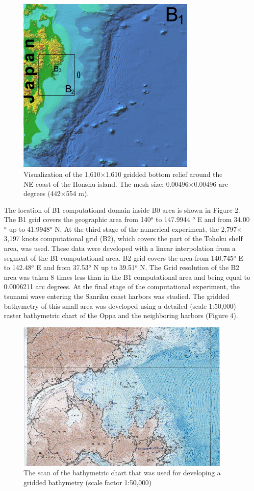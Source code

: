 \documentclass{aip-cp}
\begin{document}
\begin{figure}[h]
  \centerline{\includegraphics[width=250pt]{art/Fig_03_2.png}}
  \caption{Visualization of the 1,610$\times$1,610 gridded bottom relief around the 
NE coast of the Honshu island. The mesh size: 0.00496$\times$0.00496 arc degrees 
(442$\times$554 m).}
\end{figure}

The location of B1 computational domain inside B0 area is shown in Figure 2. 
The B1 grid covers the geographic area from 140$^{o}$ to 147.9944 $^{o}$ E 
and from 34.00$^{o}$ up to 41.9948$^{o}$ N. At the third stage of the 
numerical experiment, the 2,797$\times$3,197 knots computational grid (B2), which 
covers the part of the Tohoku shelf area, was used. These data were 
developed with a linear interpolation from a segment of the B1 computational 
area. B2 grid covers the area from 140.745$^{o}$ E to 142.48$^{o}$ E and 
from 37.53$^{o}$ N up to 39.51$^{o}$ N. The Grid resolution of the B2 area 
was taken 8 times less than in the B1 computational area and being equal to 
0.0006211 arc degrees. At the final stage of the computational experiment, 
the tsunami wave entering the Sanriku coast harbors was studied. The gridded 
bathymetry of this small area was developed using a detailed (scale 
1:50,000) raster bathymetric chart of the Oppa and the neighboring harbors 
(Figure 4).

\begin{figure}[h]
  \centerline{\includegraphics[width=300pt]{art/Fig_04.png}}
  \caption{The scan of the bathymetric chart that was used for developing a 
gridded bathymetry (scale factor 1:50,000)}
\end{figure}
\end{document}
